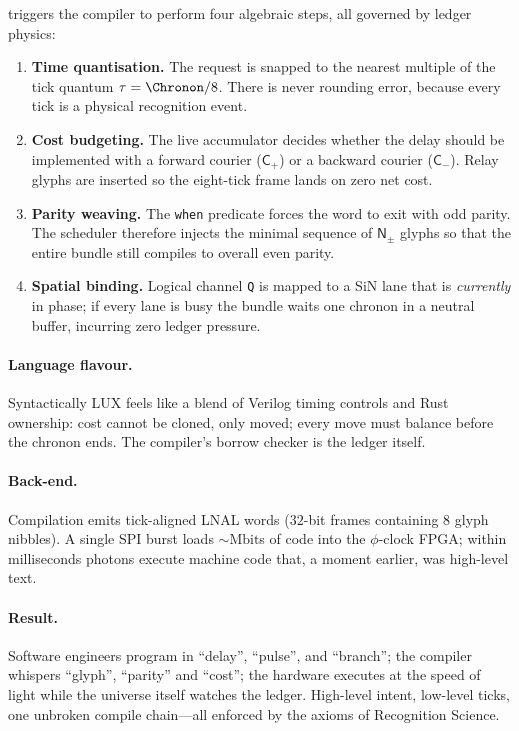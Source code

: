 \documentclass[11pt,oneside]{book}
\begin{document}
triggers the compiler to perform four algebraic steps, all governed by
ledger physics:

\begin{enumerate}[label=\arabic*.,leftmargin=*,itemsep=3pt]
\item \textbf{Time quantisation.}  
      The request is snapped to the nearest multiple of the tick
      quantum $\tau=\Chronon/8$.  There is never rounding error,
      because every tick is a physical recognition event.
\item \textbf{Cost budgeting.}  
      The live accumulator decides whether the delay should be
      implemented with a forward courier ($\mathsf{C_{+}}$) or a
      backward courier ($\mathsf{C_{-}}$).  Relay glyphs are inserted
      so the eight-tick frame lands on zero net cost.
\item \textbf{Parity weaving.}  
      The \texttt{when} predicate forces the word to exit with odd
      parity.  The scheduler therefore injects the minimal sequence of
      $\mathsf{N_{\pm}}$ glyphs so that the entire bundle still
      compiles to overall even parity.
\item \textbf{Spatial binding.}  
      Logical channel \texttt{Q} is mapped to a SiN lane that is
      \emph{currently} in phase; if every lane is busy the bundle
      waits one chronon in a neutral buffer, incurring zero ledger
      pressure.
\end{enumerate}

\paragraph{Language flavour.}
Syntactically LUX feels like a blend of Verilog timing controls and
Rust ownership: cost cannot be cloned, only moved; every move must
balance before the chronon ends.  The compiler’s borrow checker is the
ledger itself.

\paragraph{Back-end.}
Compilation emits tick-aligned LNAL words
($32$-bit frames containing $8$ glyph nibbles).  A single SPI burst
loads $\sim\!\text{Mbit}$s of code into the $\phi$-clock FPGA; within
milliseconds photons execute machine code that, a moment earlier, was
high-level text.

\paragraph{Result.}
Software engineers program in ``delay'', ``pulse'', and ``branch'';
the compiler whispers ``glyph'', ``parity'' and ``cost''; the hardware
executes at the speed of light while the universe itself watches the
ledger.  High-level intent, low-level ticks, one unbroken compile
chain—all enforced by the axioms of Recognition Science.
\end{document}
